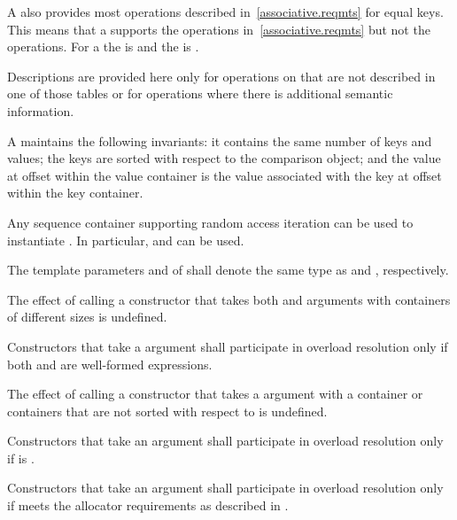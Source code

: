 \begin{codeblock}
\begin{codeblock}
\begin{codeblock}
\begin{addedblock}
\pnum
A  also provides most operations described
in~\ref{associative.reqmts} for equal keys.  This means that a
 supports the  operations
in~\ref{associative.reqmts} but not the  operations.  For
a  the  is  and the
 is .

\pnum
Descriptions are provided here only for operations on 
that are not described in one of those tables or for operations where
there is additional semantic information.

\pnum
A  maintains the following invariants: it contains the
same number of keys and values; the keys are sorted with respect to the
comparison object; and the value at offset  within the value
container is the value associated with the key at offset  within the
key container.

\pnum
Any sequence container supporting random access iteration can be used to
instantiate . In particular, 
and  can be used.

\pnum
The template parameters  and  of 
shall denote the same type as 
and , respectively.

\pnum
The effect of calling a constructor that takes both 
and  arguments with containers of different sizes is
undefined.

\pnum
Constructors that take a  argument  shall
participate in overload resolution only if both 
and  are well-formed expressions.

\pnum
The effect of calling a constructor that takes a 
argument with a container or containers that are not sorted with respect
to  is undefined.

\pnum
Constructors that take an  argument shall participate in overload
resolution only if  is .

\pnum
Constructors that take an  argument shall participate in overload
resolution only if  meets the allocator requirements as described
in .


\end{addedblock}
\end{codeblock}
\end{codeblock}
\end{codeblock}
